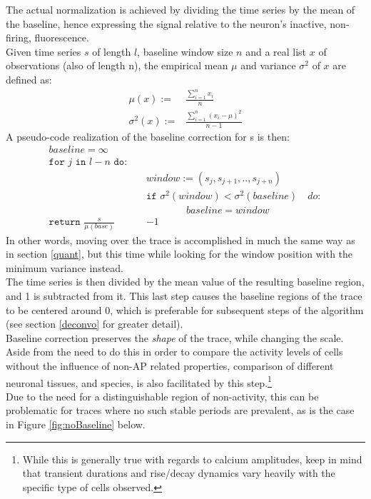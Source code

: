 \documentclass[titlepage]{article}
\begin{document}
The actual normalization is achieved by dividing the time series by the mean of the baseline, hence expressing the signal relative to the neuron's inactive, non-firing,  fluorescence.\\
Given time series $s$ of length $l$, baseline window size $n$ and a real list $x$ of observations (also of length n), the empirical mean $\mu$ and variance $\sigma^{2}$ of $x$ are defined as:
\begin{align*}
\mu(x) :=& \frac{\sum_{i=1}^{n}x_i}{n}\\
\sigma^{2}(x) :=& \frac{\sum_{i=1}^{n} (x_i - \mu)^{2}}{n-1}
\end{align*}
A pseudo-code realization of the baseline correction for s is then:
\begin{align*}
baseline = \infty \qquad \quad &\\
\texttt{for $j$ in $l-n$ do:} &\\
& window:= (s_j,s_{j+1},..,s_{j+n})\\
& \texttt{if } \sigma^{2}(window) < \sigma^{2}(baseline) \texttt\quad{do:}\\
& \qquad\qquad baseline = window\\
\texttt{return } \frac{s}{\mu(base)}&-1
\end{align*} 
In other words, moving over the trace is accomplished in much the same way as in section \ref{quant}, but this time while looking for the window position with the minimum variance instead.\\
The time series is then divided by the mean value of the resulting baseline region, and 1 is subtracted from it. This last step causes the baseline regions of the trace to be centered around 0, which is preferable for subsequent steps of the algorithm (see section \ref{deconvo} for greater detail).\\
Baseline correction preserves the \emph{shape} of the trace, while changing the scale. Aside from the need to do this in order to compare the activity levels of cells without the influence of non-AP related properties, comparison of different neuronal tissues, and species, is also facilitated by this step.\footnote{While this is generally true with regards to calcium amplitudes, keep in mind that transient durations and rise/decay dynamics vary heavily with the specific type of cells observed.}\\
Due to the need for a distinguishable region of non-activity, this can be problematic for traces where no such stable periods are prevalent, as is the case in Figure \ref{fig:noBaseline} below.\\
\end{document}
